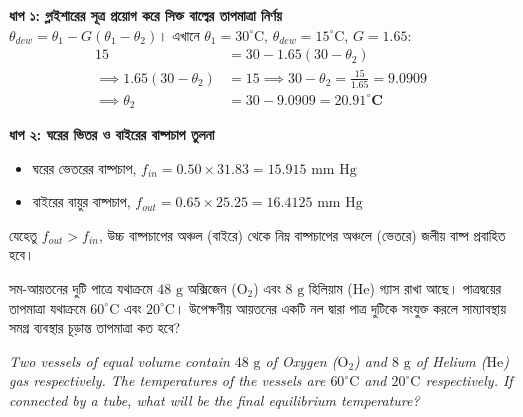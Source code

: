 \documentclass[12pt, a4paper]{article}
\begin{document}
\begin{tcolorbox}[solutionbox={সমাধান (Solution)}]
    \noindent
    \textbf{ধাপ ১: গ্লাইশারের সূত্র প্রয়োগ করে সিক্ত বাল্বের তাপমাত্রা নির্ণয়} \\
    $\theta_{dew} = \theta_1 - G (\theta_1 - \theta_2)$। এখানে $\theta_1 = 30^\circ\text{C}$, $\theta_{dew} = 15^\circ\text{C}$, $G = 1.65$:
    \begin{align*}
        15 &= 30 - 1.65 (30 - \theta_2) \\
        \implies 1.65 (30 - \theta_2) &= 15 \implies 30 - \theta_2 = \frac{15}{1.65} = 9.0909 \\
        \implies \theta_2 &= 30 - 9.0909 = \mathbf{20.91^\circ\text{C}}
    \end{align*}
    
    \vspace{0.4em}
    \noindent\textbf{ধাপ ২: ঘরের ভিতর ও বাইরের বাষ্পচাপ তুলনা}
    \begin{itemize}[leftmargin=1.5em, itemsep=0.2em]
        \item ঘরের ভেতরের বাষ্পচাপ, $f_{in} = 0.50 \times 31.83 = 15.915\text{ mm Hg}$
        \item বাইরের বায়ুর বাষ্পচাপ, $f_{out} = 0.65 \times 25.25 = 16.4125\text{ mm Hg}$
    \end{itemize}
    যেহেতু $f_{out} > f_{in}$, উচ্চ বাষ্পচাপের অঞ্চল (বাইরে) থেকে নিম্ন বাষ্পচাপের অঞ্চলে (ভেতরে) জলীয় বাষ্প প্রবাহিত হবে।
\end{tcolorbox}

\vspace{2em}

\begin{tcolorbox}[questionbox={প্রশ্ন (Question) 25}]
    \noindent
    সম-আয়তনের দুটি পাত্রে যথাক্রমে $48\text{ g}$ অক্সিজেন ($\text{O}_2$) এবং $8\text{ g}$ হিলিয়াম ($\text{He}$) গ্যাস রাখা আছে। পাত্রদ্বয়ের তাপমাত্রা যথাক্রমে $60^\circ\text{C}$ এবং $20^\circ\text{C}$। উপেক্ষণীয় আয়তনের একটি নল দ্বারা পাত্র দুটিকে সংযুক্ত করলে সাম্যাবস্থায় সমগ্র ব্যবস্থার চূড়ান্ত তাপমাত্রা কত হবে?
    
    \vspace{0.8em}
    \begin{english}
    \noindent\textit{\color{darkgray}
    Two vessels of equal volume contain $48\text{ g}$ of Oxygen ($\text{O}_2$) and $8\text{ g}$ of Helium ($\text{He}$) gas respectively. The temperatures of the vessels are $60^\circ\text{C}$ and $20^\circ\text{C}$ respectively. If connected by a tube, what will be the final equilibrium temperature?
    }
    \end{english}
\end{tcolorbox}
\end{document}
